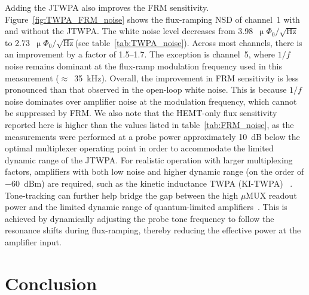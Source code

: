 \documentclass[10pt]{iopart}
\newcommand{\uMUX}{$\mu$MUX\xspace}
\newcommand{\uPhirtHz}{$\upmu \Phi_0/\sqrt{\text{Hz}}$\xspace}
\begin{document}
Adding the JTWPA also improves the FRM sensitivity. Figure~\ref{fig:TWPA_FRM_noise} shows the flux-ramping NSD of channel~1 with and without the JTWPA. The white noise level decreases from 3.98~\uPhirtHz to 2.73~\uPhirtHz (see table~\ref{tab:TWPA_noise}). Across most channels, there is an improvement by a factor of 1.5--1.7. The exception is channel~5, where $1/f$ noise remains dominant at the flux-ramp modulation frequency used in this measurement (\mbox{$\approx$~\qty{35}{\kHz}}). Overall, the improvement in FRM sensitivity is less pronounced than that observed in the open-loop white noise. This is because $1/f$ noise dominates over amplifier noise at the modulation frequency, which cannot be suppressed by FRM. We also note that the HEMT-only flux sensitivity reported here is higher than the values listed in table~\ref{tab:FRM_noise}, as the measurements were performed at a probe power approximately \qty{10}{\dB} below the optimal multiplexer operating point in order to accommodate the limited dynamic range of the JTWPA. For realistic operation with larger multiplexing factors, amplifiers with both low noise and higher dynamic range (on the order of \qty{-60}{dBm}) are required, such as the kinetic inductance TWPA (KI-TWPA) ~\cite{malnou_three-wave_2021, faramarzi_48_2024}. Tone-tracking can further help bridge the gap between the high \uMUX readout power and the limited dynamic range of quantum-limited amplifiers~\cite{yu_slac_2023, groh_demonstration_2025}. This is achieved by dynamically adjusting the probe tone frequency to follow the resonance shifts during flux-ramping, thereby reducing the effective power at the amplifier input.


\section{Conclusion}
\label{sec:conclusion}
\end{document}
